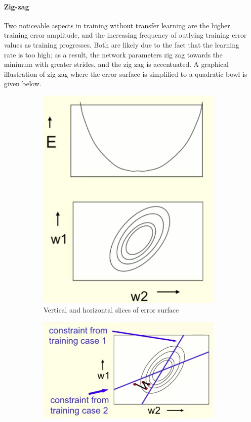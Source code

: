 \documentclass[a4paper,11pt]{article}
\begin{document}
\paragraph{Zig-zag}

Two noticeable aspects in training without transfer learning are the higher training error amplitude, and the increasing frequency of outlying training error values as training progresses. Both are likely due to the fact that the learning rate is too high; as a result, the network parameters zig zag towards the minimum with greater strides, and the zig zag is accentuated. A graphical illustration of zig-zag where the error surface is simplified to a quadratic bowl is given below. 

\begin{figure}[h!]
	\centering
	\begin{subfigure}{.5\textwidth}
  		\centering
		\includegraphics[scale=0.3]{images/gradient_descent_ellipses.png}
		\caption{Vertical and horizontal slices of error surface}
	\end{subfigure}%
	\begin{subfigure}{.5\textwidth}
  		\centering
		\includegraphics[scale=0.3]{images/gradient_descent_zigzag.png}

\end{subfigure}
\end{figure}
\end{document}
